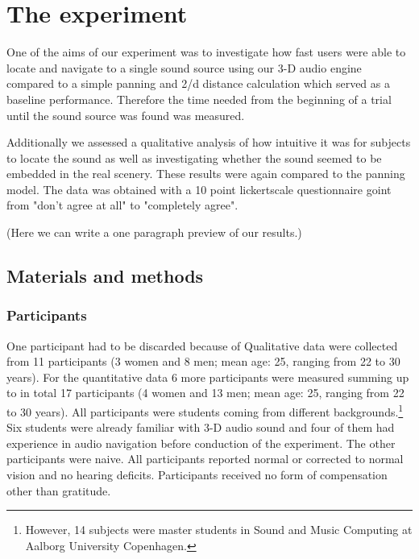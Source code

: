 \documentclass[journal]{IEEEtran}
\begin{document}
\section{The experiment}
One of the aims of our experiment was to investigate how fast users were able to locate and navigate to a single sound source using our 3-D audio engine compared to a simple panning and 2/d distance calculation which served as a baseline performance. Therefore the time needed from the beginning of a trial until the sound source was found was measured. 

Additionally we assessed a qualitative analysis of how intuitive it was for subjects to locate the sound as well as investigating whether the sound seemed to be embedded in the real scenery. These results were again compared to the panning model. The data was obtained with a 10 point lickertscale questionnaire goint from "don't agree at all" to "completely agree".

(Here we can write a one paragraph preview of our results.)
\subsection{Materials and methods}
\subsubsection{Participants}
One participant had to be discarded because of 
Qualitative data were collected from 11 participants (3 women and 8 men; mean age: 25, ranging from 22 to 30 years). For the quantitative data 6 more participants were measured summing up to in total 17 participants (4 women and 13 men; mean age: 25, ranging from 22 to 30 years). All participants were students coming from different backgrounds.\footnote{However, 14 subjects were master students in Sound and Music Computing at Aalborg University Copenhagen.} Six students were already familiar with 3-D audio sound and four of them had experience in audio navigation before conduction of the experiment. The other participants were naive. All participants reported normal or corrected to normal vision and no hearing deficits. Participants received no form of compensation other than gratitude. 
\end{document}
